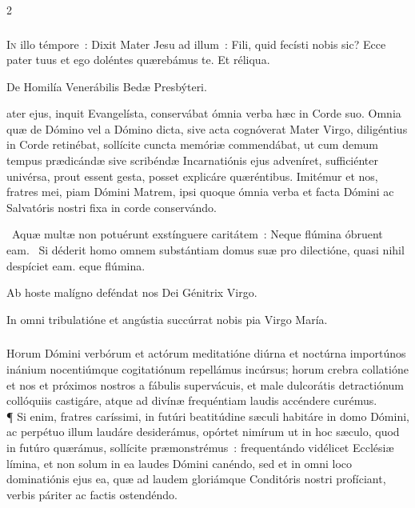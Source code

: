 \documentclass[9pt,twoside]{extarticle}
\begin{document}
\begin{multicols}{2}
\subsubsection*{\center {}}
\lettrine{I}n illo témpore~: Dixit Mater Jesu ad illum~: Fili, quid fecísti nobis sic? Ecce pater tuus et ego doléntes quærebámus te. Et réliqua.

\begin{center}De Homilía Venerábilis Bedæ Presbýteri.\\
\end{center}
ater ejus, inquit Evangelísta, conservábat ómnia verba hæc in Corde suo. Omnia quæ de Dómino vel a Dómino dicta, sive acta cognóverat Mater Virgo, diligéntius in Corde retinébat, sollícite cuncta memóriæ commendábat, ut cum demum tempus prædicándæ sive scribéndæ Incarnatiónis ejus adveníret, sufficiénter univérsa, prout essent gesta, posset explicáre quæréntibus. Imitémur et nos, fratres mei, piam Dómini Matrem, ipsi quoque ómnia verba et facta Dómini ac Salvatóris nostri fixa in corde conservándo.

\begin{tightlist}{}
\item {}~Aquæ multæ non potuérunt exstínguere caritátem~: \textred{*} Neque flúmina óbruent eam. ~Si déderit homo omnem substántiam domus suæ pro dilectióne, quasi nihil despíciet eam. eque flúmina.
\item {} Ab hoste malígno deféndat nos Dei Génitrix Virgo.
\item {} In omni tribulatióne et angústia succúrrat nobis pia Virgo María.
\end{tightlist}

\subsubsection*{\center {}}
\lettrine{H}orum Dómini verbórum et actórum meditatióne diúrna et noctúrna importúnos inánium nocentiúmque cogitatiónum repellámus incúrsus; horum crebra collatióne et nos et próximos nostros a fábulis supervácuis, et male dulcorátis detractiónum collóquiis castigáre, atque ad divínæ frequéntiam laudis accéndere curémus.\\
¶ Si enim, fratres caríssimi, in futúri beatitúdine sæculi habitáre in domo Dómini, ac perpétuo illum laudáre desiderámus, opórtet nimírum ut in hoc sæculo, quod in futúro quærámus, sollícite præmonstrémus~: frequentándo vidélicet Ecclésiæ límina, et non solum in ea laudes Dómini canéndo, sed et in omni loco dominatiónis ejus ea, quæ ad laudem gloriámque Conditóris nostri profíciant, verbis páriter ac factis ostendéndo.


\end{multicols}
\end{document}

